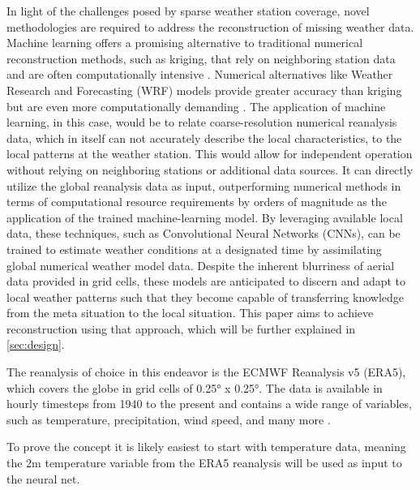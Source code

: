 
In light of the challenges posed by sparse weather station coverage, novel methodologies are required to address the reconstruction of missing weather data.
Machine learning offers a promising alternative to traditional numerical reconstruction methods, such as kriging, that rely on neighboring station data and are often computationally intensive \cite{chung2019kriging}. Numerical alternatives like Weather Research and Forecasting (WRF) models provide greater accuracy than kriging but are even more computationally demanding \cite{skamarock2008wrf}.
The application of machine learning, in this case, would be to relate coarse-resolution numerical reanalysis data, which in itself can not accurately describe the local characteristics, to the local patterns at the weather station.
This would allow for independent operation without relying on neighboring stations or additional data sources. It can directly utilize the global reanalysis data as input, outperforming numerical methods in terms of computational resource requirements by orders of magnitude \cite{kurth2023MLperformance,bi2023MLperformance,lam2023MLperformance} as the application of the trained machine-learning model.
By leveraging available local data, these techniques, such as Convolutional Neural Networks (CNNs), can be trained to estimate weather conditions at a designated time by assimilating global numerical weather model data.
Despite the inherent blurriness of aerial data provided in grid cells, these models are anticipated to discern and adapt to local weather patterns such that they become capable of transferring knowledge from the meta situation to the local situation.
This paper aims to achieve reconstruction using that approach, which will be further explained in \autoref{sec:design}.


The reanalysis of choice in this endeavor is the ECMWF Reanalysis v5 (ERA5), which covers the globe in grid cells of 0.25° x 0.25°.
The data is available in hourly timesteps from 1940 to the present and contains a wide range of variables, such as temperature, precipitation, wind speed, and many more \cite{era5}.


To prove the concept it is likely easiest to start with temperature data, meaning the 2m temperature variable from the ERA5 reanalysis will be used as input to the neural net.


